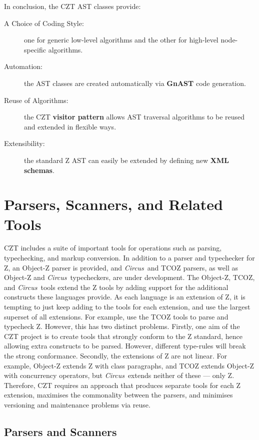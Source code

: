 \documentclass{llncs}
\newcommand{\Circus}{{\sf\slshape Circus}}
\begin{document}
  In conclusion, the CZT AST classes provide:
  \begin{description}
    \item[A Choice of Coding Style:] one for generic low-level algorithms
      and the other for high-level node-specific algorithms.
    \item[Automation:] the AST classes are created automatically via 
      \textbf{GnAST} code generation.
    \item[Reuse of Algorithms:] the CZT \textbf{visitor pattern} allows
      AST traversal algorithms to be reused and extended in flexible ways.
    \item[Extensibility:] the standard Z AST can easily be extended by
      defining new \textbf{XML schemas}.
  \end{description}


\section{Parsers, Scanners, and Related Tools}
\label{parsers}

  CZT includes a suite of important tools for operations such as
  parsing, typechecking, and markup conversion. In addition to a
  parser and typechecker for Z, an Object-Z parser is provided, and
  \Circus\ and TCOZ parsers, as well as Object-Z and \Circus\
  typecheckers, are under development.  The Object-Z, TCOZ, and
  \Circus\ tools extend the Z tools by adding support for the
  additional constructs these languages provide.  As each language is an
  extension of Z, it is tempting to just keep adding to the tools
  for each extension, and use the largest superset of all
  extensions. For example, use the TCOZ tools to parse and typecheck
  Z. However, this has two distinct problems. Firstly, one aim of the
  CZT project is to create tools that strongly conform to the Z
  standard, hence allowing extra constructs to be parsed. However,
  different type-rules will break the strong conformance. Secondly, the
  extensions of Z are not linear. For example, Object-Z extends Z with
  class paragraphs, and TCOZ extends Object-Z with concurrency
  operators, but \Circus\ extends neither of these --- only
  Z. Therefore, CZT requires an approach that produces separate tools
  for each Z extension, maximises the commonality between the parsers,
  and minimises versioning and maintenance problems via reuse.

\subsection{Parsers and Scanners}
\end{document}
